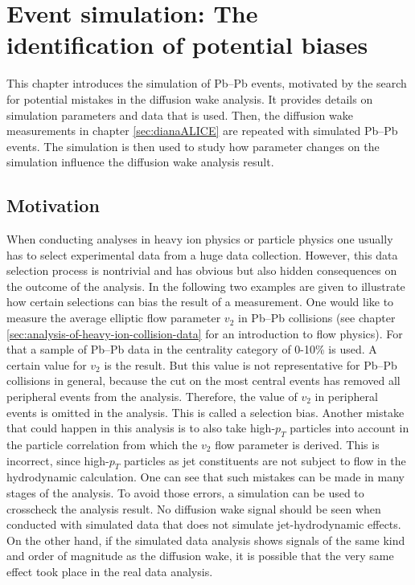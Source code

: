 \documentclass[
  a4paper,
  12pt,
  oneside,
  parskip=half,
  listof=totoc,
  bibliography=totoc,
  DIV=12,
  numbers=noenddot,
  BA.tex
  ]{subfiles}
\begin{document}
\section{Event simulation: The identification of potential biases}
\label{sec:event-simulation}

This chapter introduces the simulation of Pb--Pb events, motivated by the search for potential mistakes in the diffusion wake analysis. It provides details on simulation parameters and data that is used. Then, the diffusion wake measurements in chapter \ref{sec:dianaALICE} are repeated with simulated Pb--Pb events. The simulation is then used to study how parameter changes on the simulation influence the diffusion wake analysis result.

\subsection{Motivation}

When conducting analyses in heavy ion physics or particle physics one usually has to select experimental data from a huge data collection. However, this data selection process is nontrivial and has obvious but also hidden consequences on the outcome of the analysis. In the following two examples are given to illustrate how certain selections can bias the result of a measurement. One would like to measure the average elliptic flow parameter $v_2$ in Pb--Pb collisions (see chapter \ref{sec:analysis-of-heavy-ion-collision-data} for an introduction to flow physics). For that a sample of Pb--Pb data in the centrality category of 0-10\% is used. A certain value for $v_2$ is the result. But this value is not representative for Pb--Pb collisions in general, because the cut on the most central events has removed all peripheral events from the analysis. Therefore, the value of $v_2$ in peripheral events is omitted in the analysis. This is called a selection bias. Another mistake that could happen in this analysis is to also take high-$p_T$ particles into account in the particle correlation from which the $v_2$ flow parameter is derived. This is incorrect, since high-$p_T$ particles as jet constituents are not subject to flow in the hydrodynamic calculation. One can see that such mistakes can be made in many stages of the analysis. To avoid those errors, a simulation can be used to crosscheck the analysis result. No diffusion wake signal should be seen when conducted with simulated data that does not simulate jet-hydrodynamic effects. On the other hand, if the simulated data analysis shows signals of the same kind and order of magnitude as the diffusion wake, it is possible that the very same effect took place in the real data analysis.
\end{document}
